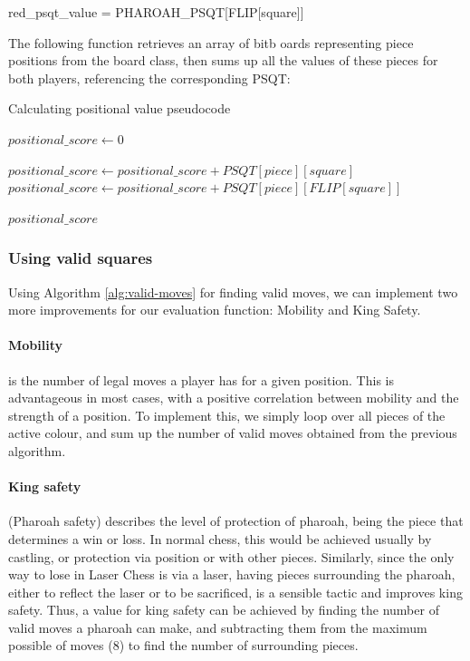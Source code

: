 \documentclass[../main/main.tex]{subfiles}
\begin{document}
\begin{center}
red\_psqt\_value = PHAROAH\_PSQT[FLIP[square]]
\end{center}

The following function retrieves an array of bitb oards representing piece positions from the board class, then sums up all the values of these pieces for both players, referencing the corresponding PSQT:

\begin{algorithm}[H]
\caption{Calculating positional value pseudocode}
\begin{algorithmic}
    \State $positional\_score \gets 0$

                    \State $positional\_score \gets positional\_score + PSQT[piece][square]$
                \Else
                    \State $positional\_score \gets positional\_score + PSQT[piece][FLIP[square]]$
                \EndIf
            \EndIf
        \EndFor
    \EndFor

    \State \Return $positional\_score$
    \EndFunction
\end{algorithmic}
\end{algorithm}

\subsubsection*{Using valid squares}
Using Algorithm \ref{alg:valid-moves} for finding valid moves, we can implement two more improvements for our evaluation function: Mobility and King Safety.

\paragraph{Mobility} is the number of legal moves a player has for a given position. This is advantageous in most cases, with a positive correlation between mobility and the strength of a position. To implement this, we simply loop over all pieces of the active colour, and sum up the number of valid moves obtained from the previous algorithm.

\paragraph{King safety} (Pharoah safety) describes the level of protection of pharoah, being the piece that determines a win or loss. In normal chess, this would be achieved usually by castling, or protection via position or with other pieces. Similarly, since the only way to lose in Laser Chess is via a laser, having pieces surrounding the pharoah, either to reflect the laser or to be sacrificed, is a sensible tactic and improves king safety. Thus, a value for king safety can be achieved by finding the number of valid moves a pharoah can make, and subtracting them from the maximum possible of moves (8) to find the number of surrounding pieces.
\end{document}
